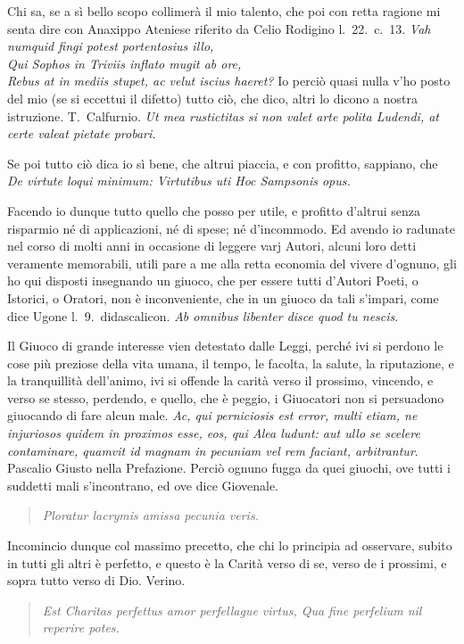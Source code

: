 \documentclass[11pt,a6paper]{article}
\newcommand{\literaryquote}[1]{%
\kern -6pt  \begin{verse}
    {\footnotesize \it #1}
  \end{verse}\kern -2pt%
}
\begin{document}
Chi sa, se a sì bello scopo collimerà il mio
talento, che poi con retta ragione mi senta
dire con Anaxippo Ateniese riferito da Celio
Rodigino l.\ 22.\ c.\ 13.
\textit{Vah numquid fingi potest portentosius illo,\\
Qui Sophos in Triviis inflato mugit ab ore,\\
Rebus at in mediis stupet, ac velut iscius haeret?}
Io perciò quasi nulla v'ho posto del mio (se
si eccettui il difetto) tutto ciò, che dico,
altri lo dicono a nostra istruzione. T.~Calfurnio.
\textit{Ut mea rustictitas si non valet arte polita
 Ludendi, at certe valeat pietate probari.}

Se poi tutto ciò dica io sì bene, che altrui
piaccia, e con profitto, sappiano, che
\textit{De virtute loqui minimum: Virtutibus uti
Hoc Sampsonis opus.}

Facendo io dunque tutto quello che posso per
utile, e profitto d'altrui senza risparmio né di
applicazioni, né di spese; né d'incommodo.
Ed avendo io radunate nel corso di molti anni
in occasione di leggere varj Autori, alcuni
loro detti veramente memorabili, utili pare
a me alla retta economia del vivere d'ognuno,
gli ho qui disposti insegnando un giuoco, che
per essere tutti d'Autori Poeti, o Istorici, o
Oratori, non è inconveniente, che in un
giuoco da tali s'impari, come dice Ugone
l.\ 9.\ didascalicon. \textit{Ab omnibus libenter disce
quod tu nescis}.


Il Giuoco di grande interesse vien detestato
dalle Leggi, perché ivi si perdono le cose
più preziose della vita umana, il tempo, le
facolta, la salute, la riputazione, e la
tranquillità dell'animo, ivi si offende la carità
verso il prossimo, vincendo, e verso se stesso,
perdendo, e quello, che è peggio, i Giuocatori
non si persuadono giuocando di fare alcun
male. \textit{Ac, qui perniciosis est error, multi
 etiam, ne injuriosos quidem in proximos esse,
 eos, qui Alea ludunt: aut ullo se scelere
 contaminare, quamvit id magnam in pecuniam
 vel rem faciant, arbitrantur}. Pascalio
Giusto nella Prefazione. Perciò ognuno
fugga da quei giuochi, ove tutti i suddetti
mali s'incontrano, ed ove dice Giovenale.

\literaryquote{Ploratur lacrymis amissa pecunia veris.}

Incomincio dunque col massimo precetto,
che chi lo principia ad osservare, subito in
tutti gli altri è perfetto, e questo è la Carità
verso di se, verso de i prossimi, e sopra tutto
verso di Dio. Verino.

\literaryquote{Est Charitas perfettus amor perfellague virtus,
Qua fine perfelium nil reperire potes.}
\end{document}
